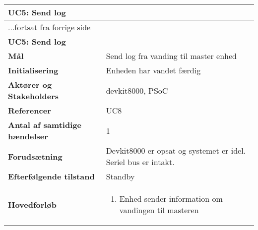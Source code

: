 \begin{center} \centering
	\begin{longtable}{|p{6cm}|p{8cm}|}  %
	\hline
		\multicolumn{2}{|l|}{\textbf{UC5: Send log}} \\\hline %
		\endfirsthead
		
		\multicolumn{2}{l}{...fortsat fra forrige side} \\ \hline %
		\multicolumn{2}{|l|}{\textbf{UC5: Send log}} \\\hline %
		\endhead	
		
		\textbf{Mål}				&Send log fra vanding til master enhed			\\\hline
		\textbf{Initialisering}					&Enheden har vandet færdig			\\\hline
		\textbf{Aktører og Stakeholders}			&devkit8000, PSoC			\\\hline
		\textbf{Referencer}						&UC8		\\\hline
		\textbf{Antal af samtidige hændelser}	&1			\\\hline
		\textbf{Forudsætning}					&Devkit8000 er opsat og systemet er idel. Seriel bus er intakt.		\\\hline
		\textbf{Efterfølgende tilstand}			&Standby			\\\hline
		\textbf{Hovedforløb}					
			&\begin{enumerate}
	
				\item Enhed sender information om vandingen til masteren
	
			\end{enumerate}\\\hline
	\end{longtable}
	\label{UC5} 
\end{center}

